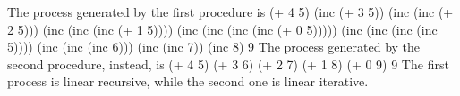 The process generated by the first procedure is
\begtt\scm
(+ 4 5)
(inc (+ 3 5))
(inc (inc (+ 2 5)))
(inc (inc (inc (+ 1 5))))
(inc (inc (inc (inc (+ 0 5)))))
(inc (inc (inc (inc 5))))
(inc (inc (inc 6)))
(inc (inc 7))
(inc 8)
9
\endtt
The process generated by the second procedure, instead, is
\begtt\scm
(+ 4 5)
(+ 3 6)
(+ 2 7)
(+ 1 8)
(+ 0 9)
9
\endtt
The first process is linear recursive, while the second one is linear iterative.
